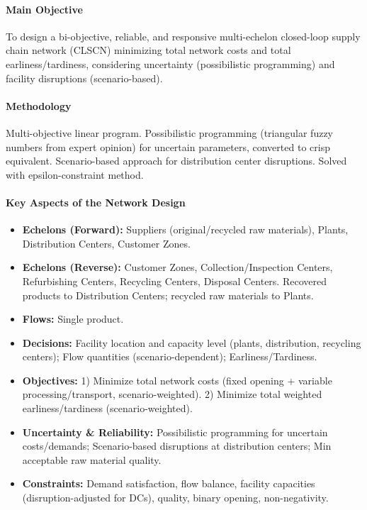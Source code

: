 \paragraph{Main Objective} To design a bi-objective, reliable, and responsive multi-echelon closed-loop supply chain network (CLSCN) minimizing total network costs and total earliness/tardiness, considering uncertainty (possibilistic programming) and facility disruptions (scenario-based).
\paragraph{Methodology} Multi-objective linear program. Possibilistic programming (triangular fuzzy numbers from expert opinion) for uncertain parameters, converted to crisp equivalent. Scenario-based approach for distribution center disruptions. Solved with epsilon-constraint method.
\paragraph{Key Aspects of the Network Design}
\begin{itemize}
    \item \textbf{Echelons (Forward):} Suppliers (original/recycled raw materials), Plants, Distribution Centers, Customer Zones.
    \item \textbf{Echelons (Reverse):} Customer Zones, Collection/Inspection Centers, Refurbishing Centers, Recycling Centers, Disposal Centers. Recovered products to Distribution Centers; recycled raw materials to Plants.
    \item \textbf{Flows:} Single product.
    \item \textbf{Decisions:} Facility location and capacity level (plants, distribution, recycling centers); Flow quantities (scenario-dependent); Earliness/Tardiness.
    \item \textbf{Objectives:} 1) Minimize total network costs (fixed opening + variable processing/transport, scenario-weighted). 2) Minimize total weighted earliness/tardiness (scenario-weighted).
    \item \textbf{Uncertainty \& Reliability:} Possibilistic programming for uncertain costs/demands; Scenario-based disruptions at distribution centers; Min acceptable raw material quality.
    \item \textbf{Constraints:} Demand satisfaction, flow balance, facility capacities (disruption-adjusted for DCs), quality, binary opening, non-negativity.
\end{itemize}
